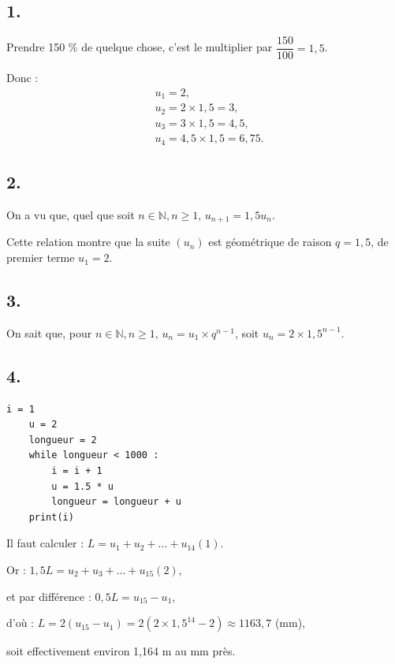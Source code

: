 \subsection*{1.}

Prendre 150 \% de quelque chose, c'est le multiplier par \(\dfrac{150}{100} = 1{,}5\).

Donc :
\begin{align*}
&u_1 = 2, \\
&u_2 = 2 \times 1{,}5 = 3, \\
&u_3 = 3 \times 1{,}5 = 4{,}5, \\
&u_4 = 4{,}5 \times 1{,}5 = 6{,}75.
\end{align*}

\subsection*{2.}

On a vu que, quel que soit \(n \in \mathbb{N}, n \geqslant 1\), \(u_{n+1} = 1{,}5 u_n\).
  
Cette relation montre que la suite \((u_n)\) est géométrique de raison \(q = 1{,}5\), de premier terme \(u_1 = 2\).

\subsection*{3.}

On sait que, pour \(n \in \mathbb{N}, n \geqslant 1\), \(u_n = u_1 \times q^{n-1}\), soit \(u_n = 2 \times 1{,}5^{n-1}\).

\subsection*{4.}

\begin{lstlisting}[style=python]
	i = 1
	u = 2
	longueur = 2
	while longueur < 1000 :
		i = i + 1
		u = 1.5 * u
		longueur = longueur + u
	print(i)
\end{lstlisting}

Il faut calculer : \(L = u_1 + u_2 + \dots + u_{14} (1)\).  

Or : \(1{,}5 L = u_2 + u_3 + \dots + u_{15} (2)\),

et par différence : \(0{,}5 L = u_{15} - u_1\),

d'où : \(L = 2(u_{15} - u_1) = 2(2 \times 1{,}5^{14} - 2) \approx 1163{,}7\) (mm),

soit effectivement environ 1{,}164 m au mm près.
